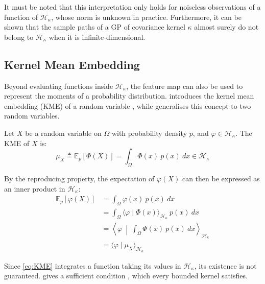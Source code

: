 It must be noted that this interpretation only holds for noiseless observations of a function of $\mathcal{H}_\kappa$, whose norm is unknown in practice. Furthermore, it can be shown \cite{bib:GP-kernel-methods} that the sample paths of a GP of covariance kernel $\kappa$ almost surely do not belong to $\mathcal{H}_\kappa$ when it is infinite-dimensional.

\subsection{Kernel Mean Embedding}

Beyond evaluating functions inside $\mathcal{H}_\kappa$, the feature map can also be used to represent the moments of a probability distribution.  introduces the kernel mean embedding (KME) of a random variable \cite{bib:KME}, while  generalises this concept to two random variables.

\begin{definition}\label{th:KME}
	Let $X$ be a random variable on $\Omega$ with probability density $p$, and $\varphi\in\mathcal{H}_\kappa$. The KME of $X$ is:
	\begin{equation}
		\mu_X\triangleq\mathbb{E}_p\left[\Phi(X)\right]=\int_{\Omega}{\Phi(x)\:p(x)\:dx}\in\mathcal{H}_\kappa\label{eq:KME}
	\end{equation}

	By the reproducing property, the expectation of $\varphi(X)$ can then be expressed as an inner product in $\mathcal{H}_\kappa$:
	\begin{equation}
		\begin{aligned}
		\mathbb{E}_p\left[\varphi(X)\right]&=\int_{\Omega}{\varphi(x)\:p(x)\:dx}\\
		&=\int_{\Omega}{\langle\varphi\mid\Phi(x)\rangle_{\mathcal{H}_\kappa}\:p(x)\:dx}\\
		&=\left\langle\varphi\:\middle|\:\int_{\Omega}{\Phi(x)\:p(x)\:dx}\right\rangle_{\mathcal{H}_\kappa}\\
		&=\langle\varphi\mid\mu_X\rangle_{\mathcal{H}_\kappa}
		\end{aligned}\label{eq:KME_expectation}
	\end{equation}
\end{definition}

Since \eqref{eq:KME} integrates a function taking its values in $\mathcal{H}_\kappa$, its existence is not guaranteed.  gives a sufficient condition \cite{bib:RKHS-Dumbgen}, which every bounded kernel satisfies.

